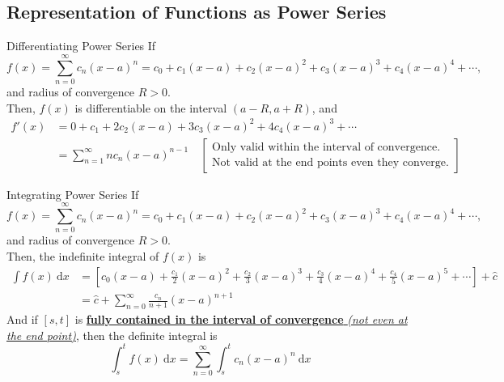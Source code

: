 \documentclass[12pt,a4paper]{article}
\def\d{{\mathrm{d}}}
\def\dx{\d x}
\begin{document}
\subsection{Representation of Functions as Power Series}
\begin{thm}{Differentiating Power Series}
	If $$f(x)=\sum^\infty_{n=0}c_n(x-a)^n=c_0+c_1(x-a)+c_2(x-a)^2+c_3(x-a)^3+c_4(x-a)^4+\cdots, $$ and radius of convergence $R>0$.\\
	Then, $f(x)$ is differentiable on the interval $(a-R, a+R)$, and
	$$\begin{aligned}
		f'(x)&=0+c_1+2c_2(x-a)+3c_3(x-a)^2+4c_4(x-a)^3+\cdots\\
		&=\sum^\infty_{n=1}nc_n(x-a)^{n-1}\quad\begin{bmatrix}\text{Only valid within the interval of convergence.}\\\text{Not valid at the end points even they converge.}\end{bmatrix}
	\end{aligned}$$
\end{thm}
\begin{thm}{Integrating Power Series}
	If $$f(x)=\sum^\infty_{n=0}c_n(x-a)^n=c_0+c_1(x-a)+c_2(x-a)^2+c_3(x-a)^3+c_4(x-a)^4+\cdots, $$ and radius of convergence $R>0$.\\
	Then, the indefinite integral of $f(x)$ is 
	$$\begin{aligned}
		\int f(x)\ \dx &=\left[c_0(x-a)+\frac{c_1}{2}(x-a)^2+\frac{c_2}{3}(x-a)^3+\frac{c_3}{4}(x-a)^4+\frac{c_4}{5}(x-a)^5+\cdots\right]+\hat{c}\\
		&=\hat{c}+\sum^\infty_{n=0}\frac{c_n}{n+1}(x-a)^{n+1}
	\end{aligned}$$
	And if $[s,t]$ is \underline{\textbf{fully contained in the interval of convergence} \textit{(not even at the end point)}}, then the definite integral is
	$$\int_s^t f(x)\ \dx=\sum^\infty_{n=0}\int_s^t c_n(x-a)^n\ \dx$$
\end{thm}
\end{document}
